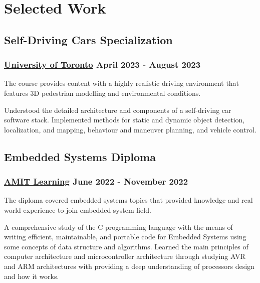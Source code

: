 \section*{Selected Work}
%
%
%
%
%
%
\subsection*{Self-Driving Cars Specialization}
\subsubsection*{
  \href{https://www.coursera.org/specializations/self-driving-cars}{University of Toronto}
  \hspace*{\fill}
  April 2023 - August 2023
}
The course provides content with a highly realistic driving environment that
features 3D pedestrian modelling and environmental conditions.
\vspace{2mm}
\begin{tasks}
  \task Understood the detailed architecture and components of a self-driving
  car software stack.
  \task Implemented methods for static and dynamic object detection, localization,
  and mapping, behaviour and maneuver planning, and vehicle control.
\end{tasks}
%
%
%
%
\subsection*{Embedded Systems Diploma}
\subsubsection*{
  \href{https://amit-learning.com/}{AMIT Learning}
  \hspace*{\fill}
  June 2022 - November 2022
}
The diploma covered embedded systems topics that provided knowledge and real
world experience to join embedded system field.
\vspace{2mm}
\begin{tasks}
  \task A comprehensive study of the C programming language with the means of writing efficient,
  maintainable, and portable code for Embedded Systems using some concepts of data structure
  and algorithms.
  \task Learned the main principles of computer architecture and microcontroller architecture
  through studying AVR and ARM architectures with providing a deep understanding of processors
  design and how it works.
\end{tasks}